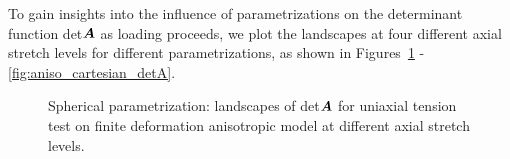 \documentclass[12pt]{article}
\numberwithin{equation}{section}
\begin{document}
To gain insights into the influence of parametrizations on the 
determinant function det${\boldsymbol{A}}$ as loading proceeds, we plot the 
landscapes at four different axial stretch levels for different 
parametrizations, as shown in Figures~\ref{fig:aniso_spherical_detA} - 
\ref{fig:aniso_cartesian_detA}.

\begin{figure}[H]
   \centering {}   
   \caption{Spherical parametrization: landscapes of det${\boldsymbol{A}}$ 
   for uniaxial tension test on finite deformation anisotropic model at
   different axial stretch levels.}
   \label{fig:aniso_spherical_detA}
 \end{figure}
\end{document}

